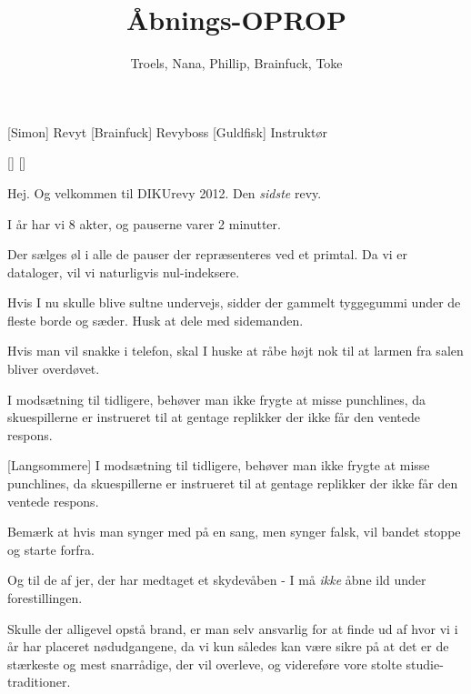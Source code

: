 \documentclass[a4paper,11pt]{article}
\title{Åbnings-OPROP}
\author{Troels, Nana, Phillip, Brainfuck, \hspace{3.5cm}Toke}
\begin{document}
\maketitle

\begin{roles}
[Simon] Revyt
[Brainfuck] Revyboss
[Guldfisk] Instruktør
\end{roles}

\begin{props}
[]
[]
\end{props}

\begin{sketch}

 Hej. Og velkommen til DIKUrevy 2012. Den \textit{sidste}
revy.

 I år har vi 8 akter, og pauserne varer 2 minutter.

 Der sælges øl i alle de pauser der repræsenteres ved et primtal. Da
vi er dataloger, vil vi naturligvis nul-indeksere.

 Hvis I nu skulle blive sultne undervejs, sidder der gammelt
tyggegummi under de fleste borde og sæder. Husk at dele med
sidemanden.

 Hvis man vil snakke i telefon, skal I huske at råbe højt nok til at
larmen fra salen bliver overdøvet.

 I modsætning til tidligere, behøver man ikke frygte at misse
punchlines, da skuespillerne er instrueret til at gentage replikker
der ikke får den ventede respons.


[Langsommere] I modsætning til tidligere, behøver man ikke
frygte at misse punchlines, da skuespillerne er instrueret til at
gentage replikker der ikke får den ventede respons.

 Bemærk at hvis man synger med på en sang, men synger falsk, vil
bandet stoppe og starte forfra.

 Og til de af jer, der har medtaget et skydevåben - I må
\textit{ikke} åbne ild under forestillingen.

 Skulle der alligevel opstå brand, er man selv ansvarlig for at
finde ud af hvor vi i år har placeret nødudgangene, da vi kun således
kan være sikre på at det er de stærkeste og mest snarrådige, der vil
overleve, og videreføre vore stolte studie-traditioner.


\end{sketch}
\end{document}
